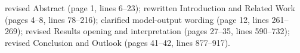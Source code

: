 {} revised Abstract (page 1, lines 6--23); rewritten Introduction and Related Work (pages 4--8, lines 78--216); clarified model-output wording (page 12, lines 261--269); revised Results opening and interpretation (pages 27--35, lines 590--732); revised Conclusion and Outlook (pages 41--42, lines 877--917).
\markdownRendererSectionEnd 
\markdownRendererSectionEnd \markdownRendererDocumentEnd